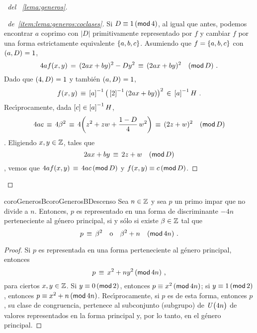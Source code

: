 \begin{proof}[\proofname~del \lemaname~\ref{lema:generos}]
\begin{proof}[\proofname~de~\ref{item:lema:generos:coclases}]
		Si $D\equiv 1\tmodulo[4]$, al igual que antes, podemos
		encontrar $a$ coprimo con $|D|$ primitivamente representado
		por $f$ y cambiar $f$ por una forma estrictamente
		equivalente $\binaria{a,b,c}$. Asumiendo que
		$f=\binaria{a,b,c}$ con $\mcd{a,D}=1$,
		\begin{displaymath}
			4af(x,y)\,=\,(2ax+by)^2-Dy^2\,\equiv\,
				(2ax+by)^2\modulo[D]
			\dispstop
		\end{displaymath}
		Dado que $\mcd{4,D}=1$ y tambi\'en $\mcd{a,D}=1$,
		\begin{displaymath}
			f(x,y)\,\equiv\,\clase a^{-1}\big(
				\clase 2^{-1}(2ax+by)\big)^2
				\,\in\,\clase a^{-1}H
			\dispstop
		\end{displaymath}
		Rec\'{\i}procamente, dada $\clase c\in\clase a^{-1}H$,
		\begin{displaymath}
			4ac\,\equiv\,4\beta^2\,\equiv\,
				4\bigg(z^2+zw+\frac{1-D} 4\,w^2\bigg)
				\,\equiv\,(2z+w)^2\modulo[D]
		\end{displaymath}
		\quedacomoejercicio.
		Eligiendo $x,y\in\Enteros$, tales que
		\begin{displaymath}
			2ax+by\,\equiv\,2z+w\modulo[D]
		\end{displaymath}
		\quedacomoejercicio,
		vemos que $4af(x,y)\,\equiv\,4ac\tmodulo[D]$ y
		$f(x,y)\equiv c\tmodulo[D]$.
	\end{proof}
\end{proof}

\begin{restatable}{coroGenerosB}{coroGenerosBDescenso}
	\label{coro:generos:cero}
	Sea $n\in\Enteros$ y sea $p$ un primo impar que no
	divide a $n$. Entonces, $p$ es representado en una forma de
	discriminante $-4n$ perteneciente al g\'enero principal, si
	y s\'olo si existe $\beta\in\Enteros$ tal que
	\begin{displaymath}
		p\,\equiv\,\beta^2\dispor\beta^2+n\modulo[4n]
		\dispstop
	\end{displaymath}
\end{restatable}

\begin{proof}
	Si $p$ es representada en una forma perteneciente al g\'enero
	principal, entonces
	\begin{displaymath}
		p\,\equiv\,x^2+ny^2\tmodulo[4n]
		\dispcomma
	\end{displaymath}
	para ciertos $x,y\in\Enteros$.
	Si $y\equiv 0\tmodulo[2]$, entonces $p\equiv x^2\tmodulo[4n]$;
	si $y\equiv 1\tmodulo[2]$, entonces $p\equiv x^2+n\tmodulo[4n]$.
	Rec\'{\i}procamente, si $p$ es de esta forma, entonces $p$,
	su clase de congruencia, pertenece al subconjunto (subgrupo)
	de $\Unidadesmod[4n]$ de valores representados en la forma
	principal y, por lo tanto, en el g\'enero principal.
\end{proof}

